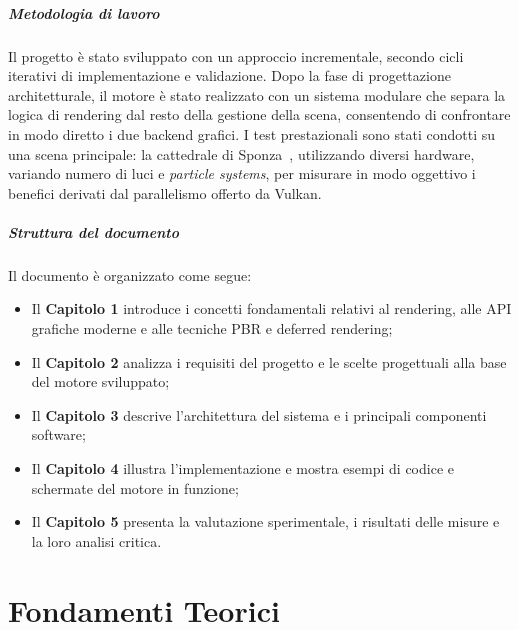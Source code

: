 \documentclass[12pt,a4paper,openright,twoside]{book}
\begin{document}
\paragraph{Metodologia di lavoro}
Il progetto è stato sviluppato con un approccio incrementale, secondo cicli iterativi di implementazione e validazione.
Dopo la fase di progettazione architetturale, il motore è stato realizzato con un sistema modulare che separa la logica
di rendering dal resto della gestione della scena, consentendo di confrontare in modo diretto i due backend grafici.
I test prestazionali sono stati condotti su una scena principale: la cattedrale di Sponza~\cite{sponza_original,sponza_intel2022},
utilizzando diversi hardware, variando numero di luci e \emph{particle systems}, per misurare in modo oggettivo i benefici derivati
dal parallelismo offerto da Vulkan.

\paragraph{Struttura del documento}
Il documento è organizzato come segue:
\begin{itemize}
   \item Il \textbf{Capitolo 1} introduce i concetti fondamentali relativi al rendering, alle API grafiche moderne e alle tecniche PBR e deferred rendering;
   \item Il \textbf{Capitolo 2} analizza i requisiti del progetto e le scelte progettuali alla base del motore sviluppato;
   \item Il \textbf{Capitolo 3} descrive l'architettura del sistema e i principali componenti software;
   \item Il \textbf{Capitolo 4} illustra l'implementazione e mostra esempi di codice e schermate del motore in funzione;
   \item Il \textbf{Capitolo 5} presenta la valutazione sperimentale, i risultati delle misure e la loro analisi critica.
\end{itemize}

\chapter{Fondamenti Teorici}
\label{chap:background}
\end{document}
